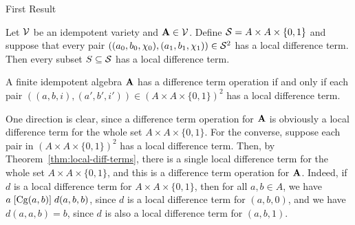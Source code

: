 \documentclass[12pt,xcolor=dvipsnames%
   ]{beamer}
\begin{document}
\begin{frame}{First Result}

\begin{theorem}
  \label{thm:local-diff-terms}
  Let $\mathcal{V}$ be an idempotent variety and
  $\mathbf{A} \in \mathcal{V}$. Define
  $\mathcal{S}= A \times A \times \{0,1\}$
  and suppose that every pair
  $((a_0, b_0, \chi_0), (a_1, b_1, \chi_1)) \in \mathcal{S}^2$
  has a local difference term.
  Then every subset $S \subseteq \mathcal{S}$
  has a local difference term.
\end{theorem}

\begin{corollary}
  \label{cor:loc-diff-term}
  A finite idempotent algebra $\mathbf{A}$ has a difference term operation if and
  only if each pair $((a,b,i), (a',b',i')) \in (A\times A \times \{0,1\})^2$ has a local
  difference term.
\end{corollary}


\begin{note}
  One direction is clear, since a difference term operation for $\mathbf{A}$ is
  obviously a local difference term for the whole set 
  $A\times A \times \{0,1\}$.
  For the converse, suppose
  each pair in $(A\times A \times \{0,1\})^2$ has a local
  difference term. Then, by Theorem~\ref{thm:local-diff-terms},
  there is a single local difference term for the whole set $A\times A \times \{0,1\}$,
  and this is a difference term operation for $\mathbf{A}$.  Indeed, if $d$ is a
  local difference term for $A\times A \times \{0,1\}$, then 
  for all $a, b \in A$, we have
  $a \mathrel{[\operatorname{Cg}(a,b)]} d(a,b,b)$,
  since $d$ is a local difference term for $(a,b,0)$, and we have
  $d(a,a,b) = b$, since $d$ is also a local difference term for
  $(a,b,1)$.
\end{note}
\end{frame}
\end{document}
